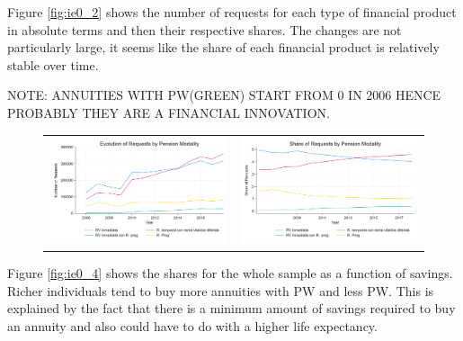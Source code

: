 \documentclass[12pt]{article}
\begin{document}
Figure \ref{fig:ie0_2} shows the number of requests for each type of financial product in absolute terms and then their respective shares. The changes are not particularly large, it seems like the share of each financial product is relatively stable over time.

NOTE: ANNUITIES WITH PW(GREEN) START FROM 0 IN 2006 HENCE PROBABLY THEY ARE A FINANCIAL INNOVATION. 

\begin{figure}[H]
\caption{}
 \label{fig:ie0_2and3}
\centering{}%
\begin{tabular}{cc}
\includegraphics[scale=0.27]{figures/IE0_plot2.png} & \includegraphics[scale=0.27]{figures/IE0_plot3.png}
\end{tabular}
\end{figure}


Figure \ref{fig:ie0_4} shows the shares for the whole sample as a function of savings. Richer individuals tend to buy more annuities with PW and less PW. This is explained by the fact that there is a minimum amount of savings required to buy an annuity and also could have to do with a higher life expectancy. 
\end{document}
